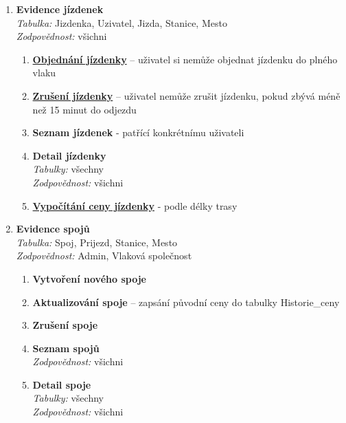 \documentclass[11pt]{article}
\begin{document}
\begin{enumerate}
    \item \textbf{Evidence jízdenek}\\
        \textit{Tabulka:} Jizdenka, Uzivatel, Jizda, Stanice, Mesto\\
        \textit{Zodpovědnost:} všichni
        \begin{enumerate}
            \item \underline{\textbf{Objednání jízdenky}} – uživatel si nemůže objednat jízdenku do plného vlaku
            \item \underline{\textbf{Zrušení jízdenky}} – uživatel nemůže zrušit jízdenku, pokud zbývá méně než 15 minut do odjezdu
            \item \textbf{Seznam jízdenek} - patřící konkrétnímu uživateli
            \item \textbf{Detail jízdenky}\\
            \textit{Tabulky:} všechny\\
            \textit{Zodpovědnost:} všichni
            \item \underline{\textbf{Vypočítání ceny jízdenky}} - podle délky trasy
        \end{enumerate}

    \item \textbf{Evidence spojů}\\
        \textit{Tabulka:} Spoj, Prijezd, Stanice, Mesto\\
        \textit{Zodpovědnost:} Admin, Vlaková společnost
        \begin{enumerate}
            \item \textbf{Vytvoření nového spoje}
            \item \textbf{Aktualizování spoje} – zapsání původní ceny do tabulky Historie\_ceny
            \item \textbf{Zrušení spoje}
            \item \textbf{Seznam spojů}\\
            \textit{Zodpovědnost:} všichni
            \item \textbf{Detail spoje}\\
            \textit{Tabulky:} všechny\\
            \textit{Zodpovědnost:} všichni
        \end{enumerate}


\end{enumerate}
\end{document}
